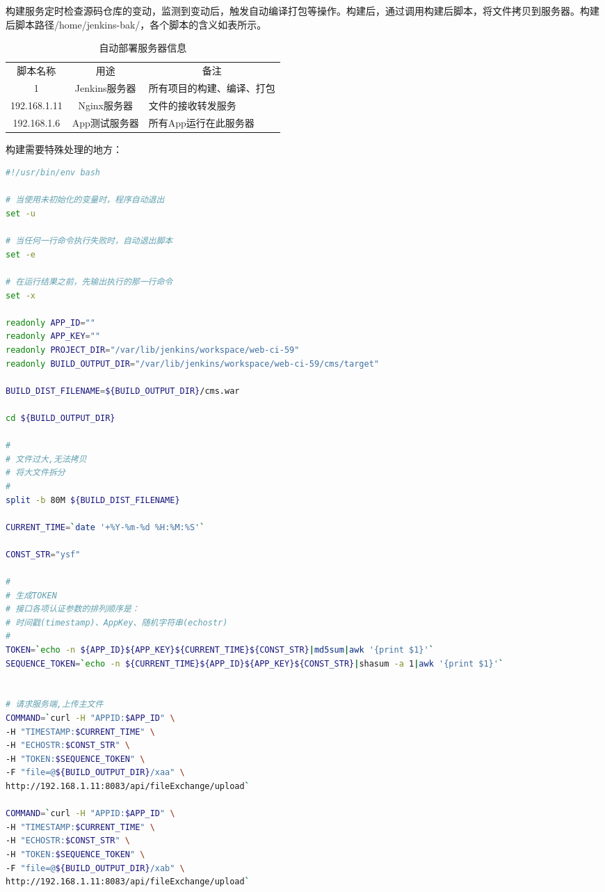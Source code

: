 \documentclass{book}
\begin{document}
构建服务定时检查源码仓库的变动，监测到变动后，触发自动编译打包等操作。构建后，通过调用构建后脚本，将文件拷贝到服务器。构建后脚本路径/home/jenkins-bak/，各个脚本的含义如表所示。

\begin{table}[htbp]
	\caption{自动部署服务器信息}
	\label{table:databaseconnectionpool}
	\begin{center}
		\begin{tabular}{|c|c|p{7cm}|}
			\hline
			\multirow{1}{*}{脚本名称}
			& \multicolumn{1}{c|}{用途} 
			& \multicolumn{1}{c|}{备注}\\			
			\cline{1-3}
			1 &  Jenkins服务器  & 所有项目的构建、编译、打包 \\
			\hline
			192.168.1.11 & Nginx服务器 & 文件的接收转发服务 \\
			\hline
			192.168.1.6 & App测试服务器 & 所有App运行在此服务器 \\
			\hline				
		\end{tabular}	
	\end{center}
\end{table}

构建需要特殊处理的地方：


\begin{lstlisting}[language=Bash]
#!/usr/bin/env bash

# 当使用未初始化的变量时，程序自动退出
set -u

# 当任何一行命令执行失败时，自动退出脚本
set -e

# 在运行结果之前，先输出执行的那一行命令
set -x

readonly APP_ID=""
readonly APP_KEY=""
readonly PROJECT_DIR="/var/lib/jenkins/workspace/web-ci-59"
readonly BUILD_OUTPUT_DIR="/var/lib/jenkins/workspace/web-ci-59/cms/target"

BUILD_DIST_FILENAME=${BUILD_OUTPUT_DIR}/cms.war

cd ${BUILD_OUTPUT_DIR}

#
# 文件过大,无法拷贝
# 将大文件拆分
#
split -b 80M ${BUILD_DIST_FILENAME}

CURRENT_TIME=`date '+%Y-%m-%d %H:%M:%S'`

CONST_STR="ysf"

#
# 生成TOKEN
# 接口各项认证参数的排列顺序是：
# 时间戳(timestamp)、AppKey、随机字符串(echostr)
#
TOKEN=`echo -n ${APP_ID}${APP_KEY}${CURRENT_TIME}${CONST_STR}|md5sum|awk '{print $1}'`
SEQUENCE_TOKEN=`echo -n ${CURRENT_TIME}${APP_ID}${APP_KEY}${CONST_STR}|shasum -a 1|awk '{print $1}'`


# 请求服务端,上传主文件
COMMAND=`curl -H "APPID:$APP_ID" \
-H "TIMESTAMP:$CURRENT_TIME" \
-H "ECHOSTR:$CONST_STR" \
-H "TOKEN:$SEQUENCE_TOKEN" \
-F "file=@${BUILD_OUTPUT_DIR}/xaa" \
http://192.168.1.11:8083/api/fileExchange/upload`

COMMAND=`curl -H "APPID:$APP_ID" \
-H "TIMESTAMP:$CURRENT_TIME" \
-H "ECHOSTR:$CONST_STR" \
-H "TOKEN:$SEQUENCE_TOKEN" \
-F "file=@${BUILD_OUTPUT_DIR}/xab" \
http://192.168.1.11:8083/api/fileExchange/upload`
\end{lstlisting}
\end{document}
